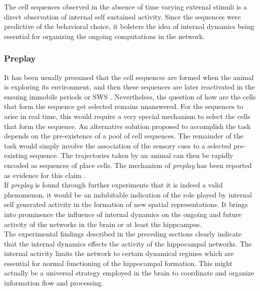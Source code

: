 The cell sequences observed in the absence of time varying external stimuli is a direct observation of internal self sustained activity. Since the sequences were predictive of the behavioral choice, it bolsters the idea of internal dynamics being essential for organizing the ongoing computations in the network.

\subsubsection{Preplay}
It has been usually presumed that the cell sequences are formed when the animal is exploring its environment, and then these sequences are later reactivated in the ensuing immobile periods or SWS \cite{Foster2006, Davidson2009}. Nevertheless, the question of how are the cells that form the sequence get selected remains unanswered. For the sequences to arise in real time, this would require a very special mechanism to select the cells that form the sequence. An alternative solution proposed to accomplish the task depends on the pre-existence of a pool of cell sequences. The remainder of the task would simply involve the association of the sensory cues to a selected pre-existing sequence. The trajectories taken by an animal can then be rapidly encoded as sequences of place cells. The mechanism of \emph{preplay} has been reported as evidence for this claim  \cite{Dragoi2011, Dragoi2013a}.\\
If \emph{preplay} is found through further experiments that it is indeed a valid phenomenon, it would be an indubitable indication of the role played by internal self generated activity in the formation of new spatial representations. It brings into prominence the influence of internal dynamics on the ongoing and future activity of the networks in the brain or at least the hippcampus. \\


The experimental findings described in the preceding sections clearly indicate that the internal dynamics effects the activity of the hippocampal networks. The internal activity limits the network to certain dynamical regimes which are essential for normal functioning of the hippocampal formation. This might actually be a universal strategy employed in the brain to coordinate and organize information flow and processing.\\

